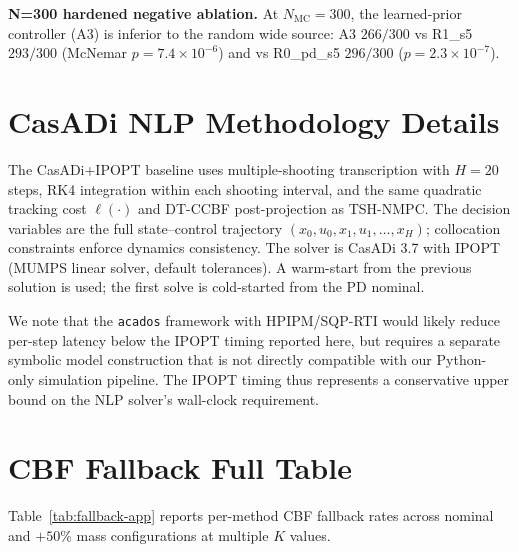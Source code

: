\documentclass[11pt,onecolumn,a4paper]{article}
\newcommand{\Nm}{N_{\mathrm{MC}}}
\begin{document}
\begin{appendices}
\textbf{N=300 hardened negative ablation.}
At $\Nm = 300$, the learned-prior controller (A3) is inferior to the
random wide source: A3 $266/300$ vs R1\_s5 $293/300$ (McNemar
$p = 7.4 \times 10^{-6}$) and vs R0\_pd\_s5 $296/300$
($p = 2.3 \times 10^{-7}$).

\section{CasADi NLP Methodology Details}\label{app:casadi-details}

The CasADi+IPOPT baseline uses multiple-shooting transcription with
$H = 20$ steps, RK4 integration within each shooting interval, and the
same quadratic tracking cost $\ell(\cdot)$ and DT-CCBF post-projection
as TSH-NMPC. The decision variables are the full state--control
trajectory $(x_0, u_0, x_1, u_1, \ldots, x_H)$; collocation
constraints enforce dynamics consistency. The solver is CasADi 3.7
\cite{AND19} with IPOPT \cite{WAC06} (MUMPS linear solver, default
tolerances). A warm-start from the previous solution is used; the first
solve is cold-started from the PD nominal.

We note that the \texttt{acados} framework \cite{VER22} with
HPIPM/SQP-RTI would likely reduce per-step latency below the IPOPT
timing reported here, but requires a separate symbolic model
construction that is not directly compatible with our Python-only
simulation pipeline. The IPOPT timing thus represents a conservative
upper bound on the NLP solver's wall-clock requirement.

\section{CBF Fallback Full Table}\label{app:cbf-details}

Table~\ref{tab:fallback-app} reports per-method CBF fallback rates
across nominal and $+50\%$ mass configurations at multiple $K$ values.


\end{appendices}
\end{document}
